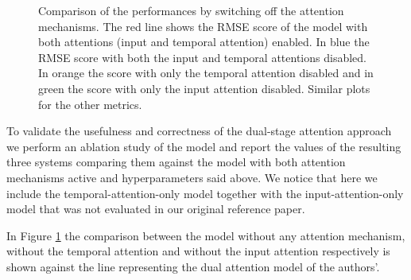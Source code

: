 \documentclass{article}
\begin{document}
\begin{figure}[h]
  \centering
  \caption{Comparison of the performances by switching off the attention
  mechanisms. The red line shows the RMSE score of the model with both
  attentions (input and temporal attention) enabled. In blue the RMSE score
  with both the input and temporal attentions disabled. In orange the score
  with only the temporal attention disabled and in green the score with
  only the input attention disabled. Similar plots for the other metrics.}
  \label{fig:ablation}
\end{figure}

To validate the usefulness and correctness of the dual-stage attention approach
we perform an ablation study of the model and report the values of the
resulting three systems comparing them against the model with both attention
mechanisms active and hyperparameters said above. We notice that here we
include the temporal-attention-only model together with the
input-attention-only model that was not evaluated in our original reference
paper.

In Figure \ref{fig:ablation} the comparison between the model without any
attention mechanism, without the temporal attention and without the input
attention respectively is shown against the line representing the dual
attention model of the authors'.
\end{document}
